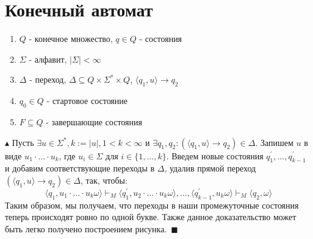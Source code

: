 \documentclass[11pt,a4paper]{report}
\theoremstyle{definition}
\theoremstyle{definition}
\theoremstyle{definition}
\begin{document}
\section{Конечный автомат}
\begin{enumerate}
\item{$Q$ - конечное множество, $q \in Q$ - состояния}
\item{$\Sigma$ - алфавит, $|\Sigma| < \infty$}
\item{$\Delta$ - переход, $\Delta\subseteq Q\times\Sigma^*\times Q$, $\langle q_1, u\rangle\rightarrow q_2$}
\item{$q_0\in Q$ - стартовое состояние}
\item{$F\subseteq Q$ - завершающие состояния}
\end{enumerate}
\newline
$\blacktriangle$ Пусть $\exists u \in \Sigma^*, k:= |u|, 1 < k < \infty$ и $\exists q_1, q_2: (\langle q_1, u \rangle\rightarrow q_2)\in \Delta$. Запишем $u$ в виде $u_1\cdot\ldots\cdot u_k$, где $u_i \in \Sigma$ для $i\in\{1, \ldots, k\}$. Введем новые состояния 
$q_1^\prime, \ldots, q_{k-1}^\prime$ и добавим соответствующие переходы в $\Delta$, удалив прямой переход $(\langle q_1, u \rangle\rightarrow q_2)\in \Delta$, так, чтобы:
\[ \langle q_1, u_1\cdot\ldots\cdot u_k\omega \rangle\vdash_M \langle q_1^\prime, u_2\cdot\ldots\cdot u_k\omega\rangle, \ldots,
\langle q_{k-1}^\prime, u_k\omega \rangle\vdash_M \langle q_2, \omega\rangle\]
Таким образом, мы получаем, что переходы в наши промежуточные состояния теперь происходят ровно по одной букве. Также данное доказательство может быть легко получено построением рисунка.~$\blacksquare$
\newline
\end{document}
